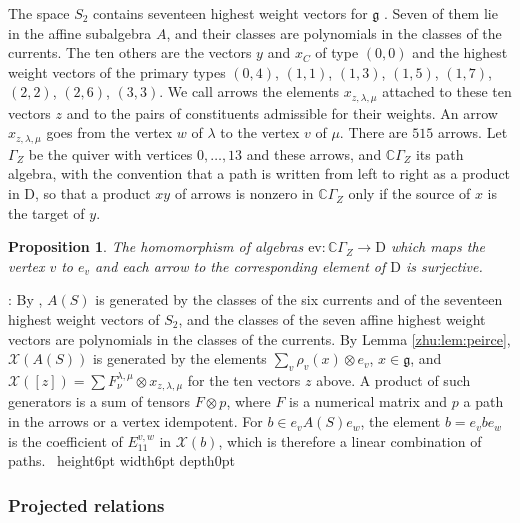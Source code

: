 \documentclass[leqno]{article}
\newcommand{\Cbb}{\ensuremath{\mathbb{C}}}
\newcommand{\D}{\mathrm{D}}
\newcommand{\qed}{\hfill \vrule height6pt  width6pt depth0pt}
\newcommand{\co}{\colon}
\newcommand{\ot}{\otimes}
\newtheorem{prop}[thm]{Proposition}
\newenvironment{proof}[1][]{\noindent {\it Proof #1} : }{\hbox{~}\qed
\smallskip
}
\numberwithin{equation}{section}
\begin{document}
The space $S_2$ contains seventeen highest weight vectors for $\mathfrak g$ \cite[Proposition 11.3]{Arh26}. Seven of them lie in the affine subalgebra $A$, and their classes are polynomials in the classes of the currents. The ten others are the vectors $y$ and $x_C$ of type $(0,0)$ and the highest weight vectors of the primary types $(0,4)$, $(1,1)$, $(1,3)$, $(1,5)$, $(1,7)$, $(2,2)$, $(2,6)$, $(3,3)$. We call arrows the elements $x_{z,\lambda,\mu}$ attached to these ten vectors $z$ and to the pairs of constituents admissible for their weights. An arrow $x_{z,\lambda,\mu}$ goes from the vertex $w$ of $\lambda$ to the vertex $v$ of $\mu$. There are $515$ arrows. Let $\Gamma_Z$ be the quiver with vertices $0, \ldots, 13$ and these arrows, and $\Cbb\Gamma_Z$ its path algebra, with the convention that a path is written from left to right as a product in $\D$, so that a product $xy$ of arrows is nonzero in $\Cbb\Gamma_Z$ only if the source of $x$ is the target of $y$.

\begin{prop}
\label{zhu:prop:generation}
The homomorphism of algebras $\mathrm{ev} \co \Cbb\Gamma_Z \to \D$ which maps the vertex $v$ to $e_v$ and each arrow to the corresponding element of $\D$ is surjective.
\end{prop}

\begin{proof}
By \cite[Proposition 11.3]{Arh26}, $A(S)$ is generated by the classes of the six currents and of the seventeen highest weight vectors of $S_2$, and the classes of the seven affine highest weight vectors are polynomials in the classes of the currents. By Lemma \ref{zhu:lem:peirce}, $\mathcal X(A(S))$ is generated by the elements $\sum_v \rho_v(x) \ot e_v$, $x \in \mathfrak g$, and $\mathcal X([z]) = \sum F^{\lambda,\mu}_\nu \ot x_{z,\lambda,\mu}$ for the ten vectors $z$ above. A product of such generators is a sum of tensors $F \ot p$, where $F$ is a numerical matrix and $p$ a path in the arrows or a vertex idempotent. For $b \in e_v A(S) e_w$, the element $b = e_v b e_w$ is the coefficient of $E^{v,w}_{11}$ in $\mathcal X(b)$, which is therefore a linear combination of paths.
\end{proof}

\subsubsection{Projected relations}
\label{zhu:subsec:projected}
\end{document}

